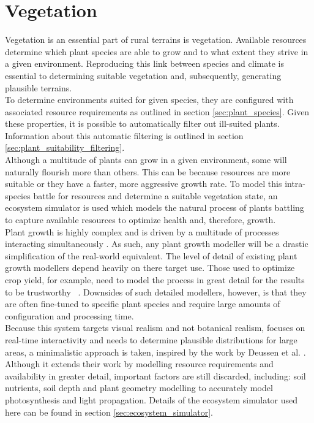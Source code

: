 \chapter{Vegetation} \label{chap:vegetation}

Vegetation is an essential part of rural terrains is vegetation. Available resources determine which plant species are able to grow and to what extent they strive in a given environment. Reproducing this link between species and climate is essential to determining suitable vegetation and, subsequently, generating plausible terrains. \\

To determine environments suited for given species, they are configured with associated resource requirements as outlined in section \ref{sec:plant_species}. Given these properties, it is possible to automatically filter out ill-suited plants. Information about this automatic filtering is outlined in section \ref{sec:plant_suitability_filtering}.\\

Although a multitude of plants can grow in a given environment, some will naturally flourish more than others. This can be because resources are more suitable or they have a faster, more aggressive growth rate. To model this intra-species battle for resources and  determine a suitable vegetation state, an ecosystem simulator is used which models the natural process of plants battling to capture available resources to optimize health and, therefore, growth.\\
Plant growth is highly complex and is driven by a multitude of processes interacting simultaneously \cite{Fourcaud2008}. As such, any plant growth modeller will be a drastic simplification of the real-world equivalent. The level of detail of existing plant growth modellers depend heavily on there target use. Those used to optimize crop yield, for example, need to model the process in great detail for the results to be trustworthy ~\cite{Soler2001,Soler2003,Yan2004}. Downsides of such detailed modellers, however, is that they are often fine-tuned to specific plant species and require large amounts of configuration and processing time.\\
Because this system targets visual realism and not botanical realism, focuses on real-time interactivity and needs to determine plausible distributions for large areas, a minimalistic approach is taken, inspired by the work by Deussen et al. \cite{Deussen1998}. Although it extends their work by modelling resource requirements and availability in greater detail, important factors are still discarded, including: soil nutrients, soil depth and plant geometry modelling to accurately model photosynthesis and light propagation. Details of the ecosystem simulator used here can be found in section \ref{sec:ecosystem_simulator}.\\

